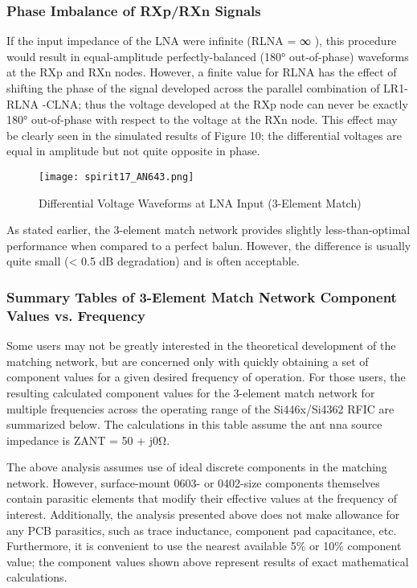       \subsubsection{Phase Imbalance of RXp/RXn Signals}
        If the input impedance of the LNA were infinite (RLNA = ∞ ), this procedure would result in 
        equal-amplitude perfectly-balanced (180° out-of-phase) waveforms at the RXp and RXn nodes. 
        However, a finite value for RLNA has the effect of shifting the phase of the signal 
        developed across the parallel combination of LR1- RLNA -CLNA; thus the voltage developed at 
        the RXp node can never be exactly 180° out-of-phase with respect to the voltage at the RXn 
        node. This effect may be clearly seen in the simulated results of Figure 10; the 
        differential voltages are equal in amplitude but not quite opposite in phase.
        \begin{figure}[ht!] %
          \centering
          \texttt{[image: spirit17\_AN643.png]}
          \caption{Differential Voltage Waveforms at LNA Input (3-Element Match) 
                  \cite[s.~11]{AN643SiliconLabs}}
          \label{EXP001:fig_spirit17}
        \end{figure}
        
        As stated earlier, the 3-element match network provides slightly less-than-optimal 
        performance when compared to a perfect balun. However, the difference is usually quite 
        small (< 0.5 dB degradation) and is often acceptable. 
        
      \subsubsection{Summary Tables of 3-Element Match Network Component Values vs. Frequency}
        Some users may not be greatly interested in the theoretical development of the matching 
        network, but are concerned only with quickly obtaining a set of component values for a 
        given desired frequency of operation. For those users, the resulting calculated component 
        values for the 3-element match network for multiple frequencies across the operating range 
        of the Si446x/Si4362 RFIC are summarized below. The calculations in this table assume the 
        ant nna source impedance is ZANT = 50 + j0Ω.
        
        The above analysis assumes use of ideal discrete components in the matching network. 
        However, surface-mount 0603- or 0402-size components themselves contain parasitic elements 
        that modify their effective values at the  frequency of interest. Additionally, the 
        analysis presented above does not make allowance for any PCB parasitics, such as trace 
        inductance, component pad capacitance, etc. Furthermore, it is convenient to use the 
        nearest available 5\% or 10\% component value; the component values shown above represent 
        results of exact mathematical calculations.
        
